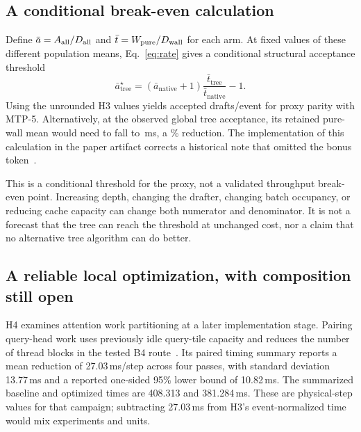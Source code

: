 \documentclass[conference]{IEEEtran}
\begin{document}
\subsection{A conditional break-even calculation}
Define $\bar a=A_{\rm all}/D_{\rm all}$ and $\bar t=W_{\rm pure}/D_{\rm wall}$ for each arm. At fixed values of these different population means, Eq.~\eqref{eq:rate} gives a conditional structural acceptance threshold
\begin{equation}
\bar a_{\mathrm{tree}}^{\star}
= (\bar a_{\mathrm{native}}+1)
\frac{\bar t_{\mathrm{tree}}}{\bar t_{\mathrm{native}}}-1.
\end{equation}
Using the unrounded H3 values yields \BreakEvenAccepted{} accepted drafts/event for proxy parity with MTP-5. Alternatively, at the observed global tree acceptance, its retained pure-wall mean would need to fall to \BreakEvenEventMs{}\,ms, a \RequiredReduction\% reduction. The implementation of this calculation in the paper artifact corrects a historical note that omitted the bonus token~\cite{lumo2026archive}.

This is a conditional threshold for the proxy, not a validated throughput break-even point. Increasing depth, changing the drafter, changing batch occupancy, or reducing cache capacity can change both numerator and denominator. It is not a forecast that the tree can reach the threshold at unchanged cost, nor a claim that no alternative tree algorithm can do better.

\subsection{A reliable local optimization, with composition still open}
H4 examines attention work partitioning at a later implementation stage. Pairing query-head work uses previously idle query-tile capacity and reduces the number of thread blocks in the tested B4 route~\cite{lumo2026paired}. Its paired timing summary reports a mean reduction of 27.03\,ms/step across four passes, with standard deviation 13.77\,ms and a reported one-sided 95\% lower bound of 10.82\,ms. The summarized baseline and optimized times are 408.313 and 381.284\,ms. These are physical-step values for that campaign; subtracting 27.03\,ms from H3's event-normalized time would mix experiments and units.
\end{document}
